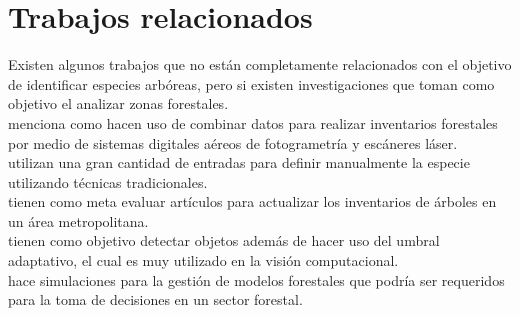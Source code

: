 \documentclass[review]{elsarticle}
\begin{document}
\section{Trabajos relacionados}
Existen algunos trabajos que no están completamente relacionados con el objetivo de identificar especies arbóreas, pero si existen investigaciones que toman como objetivo el analizar zonas forestales.\\

\citet{rf14} menciona como hacen uso de combinar datos para realizar inventarios forestales por medio de sistemas digitales aéreos de fotogrametría y escáneres láser.\\

\citet{rf1}  utilizan una gran cantidad de entradas para definir manualmente la especie utilizando técnicas tradicionales.\\
 
\citet{rf2} tienen como meta evaluar artículos para actualizar los inventarios de árboles en un área metropolitana.\\ 

\citet{rf3} tienen como objetivo detectar objetos además de hacer uso del umbral adaptativo, el cual es muy utilizado en la visión computacional.\\

\citet{rf9} hace simulaciones para la gestión de modelos forestales que podría ser requeridos para la toma de decisiones en un sector forestal.\\
\end{document}
